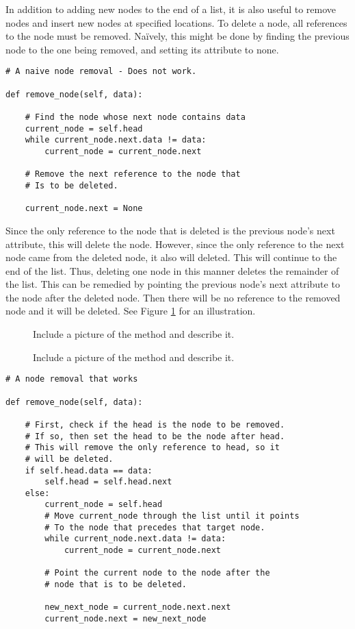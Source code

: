 In addition to adding new nodes to the end of a list, it is also useful to remove nodes and insert new nodes at specified locations.
To delete a node, all references to the node must be removed.
Na{\"i}vely, this might be done by finding the previous node to the one being removed, and setting its  attribute to none.

\begin{lstlisting}
# A naive node removal - Does not work.

def remove_node(self, data):

	# Find the node whose next node contains data
	current_node = self.head
	while current_node.next.data != data:
		current_node = current_node.next

	# Remove the next reference to the node that
	# Is to be deleted.
	
	current_node.next = None
\end{lstlisting}

Since the only reference to the node that is deleted is the previous node's next attribute, this will delete the node.
However, since the only reference to the next node came from the deleted node, it also will deleted.
This will continue to the end of the list.
Thus, deleting one node in this manner deletes the remainder of the list.
This can be remedied by pointing the previous node's next attribute to the node after the deleted node.
Then there will be no reference to the removed node and it will be deleted. 
See Figure \ref{fig:remove_node} for an illustration.

\begin{figure}
\centering
\caption{Include a picture of the  method and describe it.}
\label{fig:remove_node}
\end{figure}

\begin{figure}
\centering
\caption{Include a picture of the  method and describe it.}
\label{fig:insert_node}
\end{figure}


\begin{lstlisting}
# A node removal that works

def remove_node(self, data):

	# First, check if the head is the node to be removed.
	# If so, then set the head to be the node after head.
	# This will remove the only reference to head, so it
	# will be deleted.
	if self.head.data == data:
		self.head = self.head.next
	else:
		current_node = self.head
		# Move current_node through the list until it points
		# To the node that precedes that target node.
		while current_node.next.data != data:
			current_node = current_node.next
	
		# Point the current node to the node after the
		# node that is to be deleted.

		new_next_node = current_node.next.next
		current_node.next = new_next_node
\end{lstlisting}

